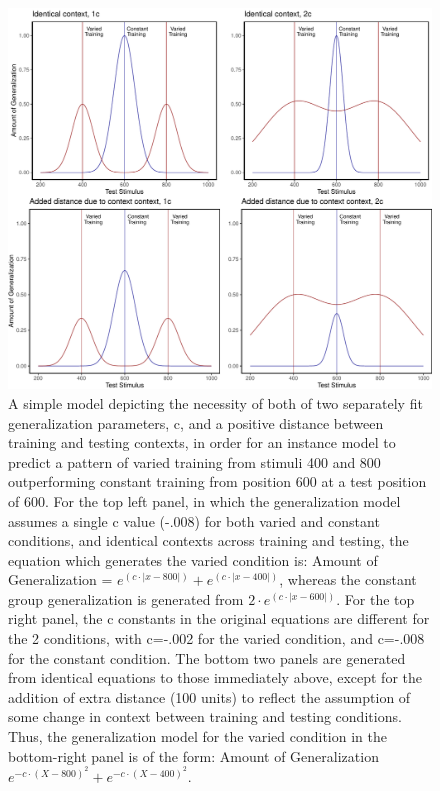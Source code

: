 \documentclass[
  man,floatsintext]{apa7}
\begin{document}
\begin{figure}
\centering
\includegraphics{IGAS_PJ_files/figure-latex/ModelFig2-1.pdf}
\caption{\label{fig:ModelFig2}A simple model depicting the necessity of both of two separately fit generalization parameters, c, and a positive distance between training and testing contexts, in order for an instance model to predict a pattern of varied training from stimuli 400 and 800 outperforming constant training from position 600 at a test position of 600. For the top left panel, in which the generalization model assumes a single c value (-.008) for both varied and constant conditions, and identical contexts across training and testing, the equation which generates the varied condition is: Amount of Generalization = \(e^{(c\cdot|x-800|)} +e^{(c\cdot|x-400|)}\), whereas the constant group generalization is generated from \(2\cdot e^{(c\cdot|x-600|)}\). For the top right panel, the c constants in the original equations are different for the 2 conditions, with c=-.002 for the varied condition, and c=-.008 for the constant condition. The bottom two panels are generated from identical equations to those immediately above, except for the addition of extra distance (100 units) to reflect the assumption of some change in context between training and testing conditions. Thus, the generalization model for the varied condition in the bottom-right panel is of the form: Amount of Generalization \(e^{-c\cdot(X-800)^2}+e^{-c\cdot(X-400)^2}\).}
\end{figure}
\end{document}
